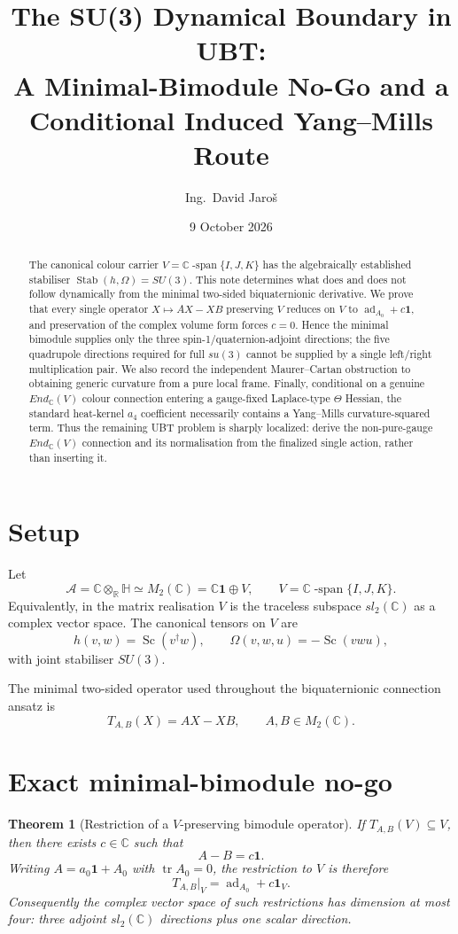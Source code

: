 \documentclass[11pt,a4paper]{article}
\title{The SU(3) Dynamical Boundary in UBT:\\
A Minimal-Bimodule No-Go and a Conditional Induced Yang--Mills Route}
\author{Ing.\ David Jaro\v{s}}
\date{9 October 2026}
\newtheorem{theorem}{Theorem}
\newcommand{\C}{\mathbb C}
\newcommand{\Hq}{\mathbb H}
\newcommand{\Aalg}{\mathcal A}
\newcommand{\Sc}{\operatorname{Sc}}
\begin{document}
\maketitle

\begin{abstract}
The canonical colour carrier
$V=\C\operatorname{-span}\{I,J,K\}$ has the algebraically established
stabiliser $\operatorname{Stab}(h,\Omega)=SU(3)$.  This note determines what
does and does not follow dynamically from the minimal two-sided
biquaternionic derivative.  We prove that every single operator
$X\mapsto AX-XB$ preserving $V$ reduces on $V$ to
$\operatorname{ad}_{A_0}+c\mathbf1$, and preservation of the complex volume
form forces $c=0$.  Hence the minimal bimodule supplies only the three
spin-1/quaternion-adjoint directions; the five quadrupole directions required
for full $su(3)$ cannot be supplied by a single left/right multiplication
pair.  We also record the independent Maurer--Cartan obstruction to obtaining
generic curvature from a pure local frame.  Finally, conditional on a genuine
$End_\C(V)$ colour connection entering a gauge-fixed Laplace-type
$\Theta$ Hessian, the standard heat-kernel $a_4$ coefficient necessarily
contains a Yang--Mills curvature-squared term.  Thus the remaining UBT problem
is sharply localized: derive the non-pure-gauge $End_\C(V)$ connection and its
normalisation from the finalized single action, rather than inserting it.
\end{abstract}

\section{Setup}

Let
\[
 \Aalg=\C\otimes_{\mathbb R}\Hq\simeq M_2(\C)
 =\C\mathbf1\oplus V,
 \qquad
 V=\C\operatorname{-span}\{I,J,K\}.
\]
Equivalently, in the matrix realisation $V$ is the traceless subspace
$sl_2(\C)$ as a complex vector space.  The canonical tensors on $V$ are
\[
 h(v,w)=\Sc(v^\dagger w),\qquad
 \Omega(v,w,u)=-\Sc(vwu),
\]
with joint stabiliser $SU(3)$.

The minimal two-sided operator used throughout the biquaternionic connection
ansatz is
\[
 T_{A,B}(X)=AX-XB,\qquad A,B\in M_2(\C).
\]

\section{Exact minimal-bimodule no-go}

\begin{theorem}[Restriction of a $V$-preserving bimodule operator]
\label{thm:restriction}
If $T_{A,B}(V)\subseteq V$, then there exists $c\in\C$ such that
\[
 A-B=c\mathbf1.
\]
Writing $A=a_0\mathbf1+A_0$ with $\operatorname{tr}A_0=0$, the restriction to
$V$ is therefore
\[
 \boxed{T_{A,B}|_V=\operatorname{ad}_{A_0}+c\mathbf1_V.}
\]
Consequently the complex vector space of such restrictions has dimension at
most four: three adjoint $sl_2(\C)$ directions plus one scalar direction.
\end{theorem}
\end{document}
